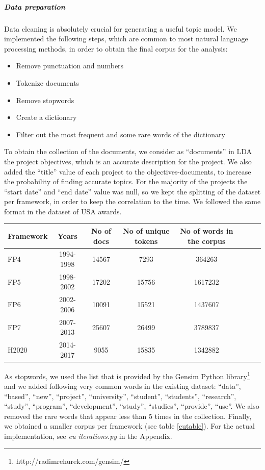\documentclass[12pt]{report}
\begin{document}
\subparagraph{Data preparation}

Data cleaning is absolutely crucial for generating a useful topic model. 
We implemented the following steps, which are common to most natural 
language processing methods, in order to obtain the final corpus for the 
analysis:

\begin{itemize}
\item Remove punctuation and numbers
\item Tokenize documents
\item Remove stopwords
\item Create a dictionary
\item Filter out the most frequent and some rare words of the dictionary
\end{itemize}

To obtain the collection of the documents, we consider as ``documents''
in LDA the project objectives, which is an accurate description for
the project. We also added the ``title'' value of each project to the
objectives-documents, to increase the probability of finding accurate
topics. For the majority of the projects the ``start date'' and ``end
date'' value was null, so we kept the splitting of the dataset per
framework, in order to keep the correlation to the time. We followed
the same format in the dataset of USA awards.

\begin{center}
\begin{tabular}{l*{6}{c}r}
Framework & Years & No of docs & No of unique tokens & No of words in the corpus \\
\hline
FP4 & 1994-1998 & 14567 & 7293 & 364263 \\
FP5 & 1998-2002 & 17202 & 15756 & 1617232 \\
FP6 & 2002-2006 & 10091 & 15521 & 1437607 \\
FP7 & 2007-2013 & 25607 & 26499 & 3789837 \\
H2020 & 2014-2017 & 9055 & 15835 & 1342882 \\
\end{tabular}
\label{eutable}
\end{center}

As stopwords, we used the list that is provided by the Gensim Python
library\footnote{http://radimrehurek.com/gensim/} and we added following very
common words in the existing dataset: ``data'', ``based'', ``new'', ``project'',
``university'', ``student'', ``students'', ``research'', ``study'', ``program'',
``development'', ``study'', ``studies'', ``provide'', ``use''. We also removed 
the rare words that appear less than 5 times in the collection. 
Finally, we obtained a smaller corpus per framework (see table \ref{eutable}). 
For the actual implementation, see \emph{eu iterations.py} in the Appendix.
\end{document}
